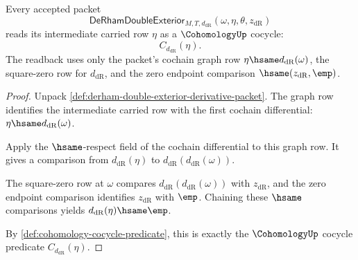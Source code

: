 \begin{theorem}
\label{thm:derham-cocycle-readback}
Every accepted packet
$$
\mathsf{DeRhamDoubleExterior}_{M,T,d_{\mathrm{dR}}}
(\omega,\eta,\theta,z_{\mathrm{dR}})
$$
reads its intermediate carried row $\eta$ as a $\CohomologyUp$ cocycle:
$$
C_{d_{\mathrm{dR}}}(\eta).
$$
The readback uses only the packet's cochain graph row
$\eta\hsame d_{\mathrm{dR}}(\omega)$, the square-zero row for
$d_{\mathrm{dR}}$, and the zero endpoint comparison
$\hsame(z_{\mathrm{dR}},\emp)$.
\end{theorem}
\begin{proof}
Unpack \autoref{def:derham-double-exterior-derivative-packet}. The graph row
identifies the intermediate carried row with the first cochain differential:
$\eta\hsame d_{\mathrm{dR}}(\omega)$.

Apply the $\hsame$-respect field of the cochain differential to this graph
row. It gives a comparison from $d_{\mathrm{dR}}(\eta)$ to
$d_{\mathrm{dR}}(d_{\mathrm{dR}}(\omega))$.

The square-zero row at $\omega$ compares
$d_{\mathrm{dR}}(d_{\mathrm{dR}}(\omega))$ with $z_{\mathrm{dR}}$, and the
zero endpoint comparison identifies $z_{\mathrm{dR}}$ with $\emp$. Chaining
these $\hsame$ comparisons yields $d_{\mathrm{dR}}(\eta)\hsame\emp$.

By \autoref{def:cohomology-cocycle-predicate}, this is exactly the
$\CohomologyUp$ cocycle predicate $C_{d_{\mathrm{dR}}}(\eta)$.
\end{proof}

